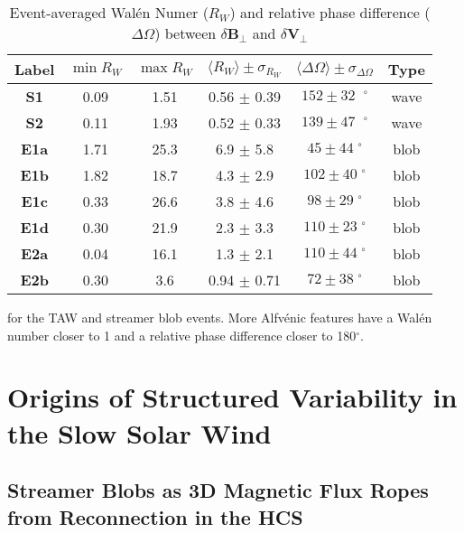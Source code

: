 \documentclass[preprint]{aastex62}
\begin{document}
\begin{table*}[htb] 
\begin{center}
\begin{tabular}{|c|c|c|c|c|c|}\hline
Label & $\min{R_W}$ & $\max{R_W}$ & $\langle R_W \rangle \pm \sigma_{R_W}$ & $ \langle \Delta \Omega \rangle \pm \sigma_{\Delta \Omega}$ & Type \\
\hline
\textbf{S1} &  0.09 &  1.51   &  0.56 $\pm$ 0.39 & $152 \pm 32 \;\;^{\circ}$ & wave \\
\textbf{S2} &  0.11 &  1.93   &  0.52 $\pm$ 0.33 & $139 \pm 47 \;\;^{\circ}$ & wave \\
\hline
\textbf{E1a} & 1.71 & 25.3  & 6.9 $\pm$ 5.8 & $45 \pm 44 \;^{\circ}$ & blob \\
\textbf{E1b} & 1.82 & 18.7  & 4.3 $\pm$ 2.9 & $102 \pm 40 \;^{\circ}$ & blob \\
\textbf{E1c} & 0.33 & 26.6  & 3.8 $\pm$ 4.6 & $98 \pm 29 \;^{\circ}$ & blob \\
\textbf{E1d} & 0.30 & 21.9  & 2.3 $\pm$ 3.3 & $110 \pm 23 \;^{\circ}$ & blob \\
\hline
\textbf{E2a} &  0.04 &  16.1 &  1.3 $\pm$ 2.1 &     $110 \pm 44 \;^{\circ}$ & blob \\
\textbf{E2b} &  0.30 &   3.6  &  0.94 $\pm$ 0.71 & $72 \pm 38 \;^{\circ}$ & blob \\
\hline
\end{tabular}
\end{center}
\caption{Event-averaged Wal\'{e}n Numer ($R_W$) and relative phase difference ($\Delta \Omega$) between $\delta \boldsymbol{B_{\perp}}$ and $\delta \boldsymbol{V_{\perp}}$} for the TAW and streamer blob events. More Alfv\'{e}nic features have a Wal\'{e}n number closer to 1 and a relative phase difference closer to 180$^{\circ}$. 
\label{tab:dhdt}
\end{table*}




\section{Origins of Structured Variability in the Slow Solar Wind}
\label{sxn_disc}


\subsection{Streamer Blobs as 3D Magnetic Flux Ropes from Reconnection in the HCS}\label{sxn_disc_hcs}
\end{document}
